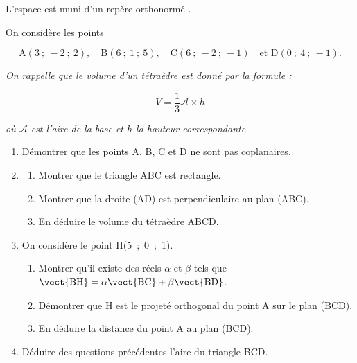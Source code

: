 \medskip

L'espace est muni d'un repère orthonormé \Oijk.

On considère les points 

\[\text{A}(3~;~-2~;~2),\quad \text{B}(6~;~1~;~5),\quad \text{C}(6~;~-2~;~-1)\quad \text{et D}(0~;~4~;~-1).\]

\emph{On rappelle que le volume d'un tétraèdre est donné par la formule :}

\[V = \dfrac13 \mathcal{A} \times h\]

\emph{où $\mathcal{A}$ est l'aire de la base et $h$ la hauteur correspondante.}

\medskip

\begin{enumerate}
\item Démontrer que les points A, B, C et D ne sont pas coplanaires.
\item 
	\begin{enumerate}
		\item Montrer que le triangle ABC est rectangle.
		\item Montrer que la droite (AD) est perpendiculaire au plan (ABC).
		\item En déduire le volume du tétraèdre ABCD.
	\end{enumerate}	
\item On considère le point H(5~;~0~;~1).
	\begin{enumerate}
		\item Montrer qu'il existe des réels $\alpha$ et $\beta$ tels que $\vect{\text{BH}} = \alpha \vect{\text{BC}} + \beta \vect{\text{BD}}$.
		\item Démontrer que H est le projeté orthogonal du point A sur le plan (BCD). 
		\item En déduire la distance du point A au plan (BCD).
	\end{enumerate}	
\item Déduire des questions précédentes l'aire du triangle BCD.
\end{enumerate}

\bigskip

